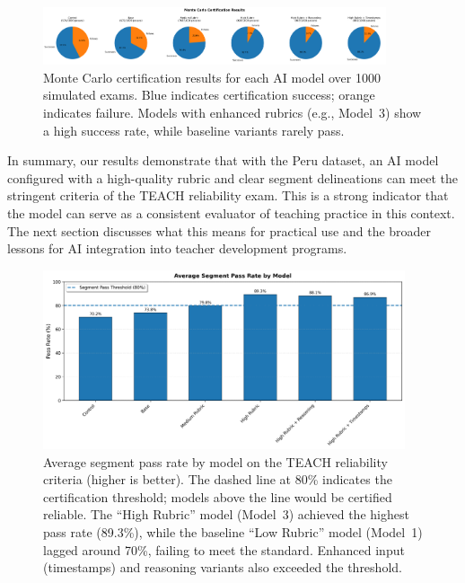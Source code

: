 \documentclass[12pt]{article}
\begin{document}
\begin{figure}[H]\centering
\includegraphics[width=0.9\textwidth]{monte_carlo_pie_charts.png}
\caption{Monte Carlo certification results for each AI model over 1000 simulated exams. Blue indicates certification success; orange indicates failure. Models with enhanced rubrics (e.g., Model~3) show a high success rate, while baseline variants rarely pass.}
\label{fig:monte-carlo-pie}
\end{figure}

In summary, our results demonstrate that with the Peru dataset, an AI model configured with a high-quality rubric and clear segment delineations can meet the stringent criteria of the TEACH reliability exam. This is a strong indicator that the model can serve as a consistent evaluator of teaching practice in this context. The next section discusses what this means for practical use and the broader lessons for AI integration into teacher development programs.

\begin{figure}[H]\centering
\includegraphics[width=0.95\textwidth]{segment_pass_dashboard.png}
\caption{Average segment pass rate by model on the TEACH reliability criteria (higher is better). The dashed line at 80\% indicates the certification threshold; models above the line would be certified reliable. The “High Rubric” model (Model~3) achieved the highest pass rate (89.3\%), while the baseline “Low Rubric” model (Model~1) lagged around 70\%, failing to meet the standard. Enhanced input (timestamps) and reasoning variants also exceeded the threshold.}
\label{fig:segment-pass-bar}
\end{figure}
\end{document}

